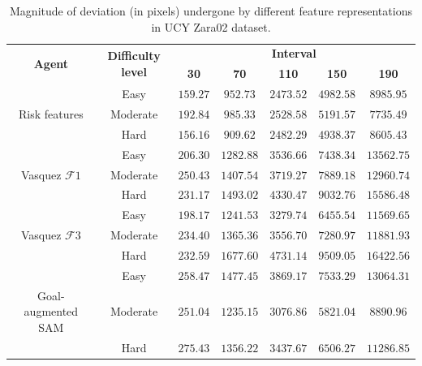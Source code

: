 \begin{table}[htbp]
	\begin{center}
		\renewcommand{\arraystretch}{1.3}
		\begin{tabular}{|c|c|c|c|c|c|c|}
			\hline
			\multicolumn{1}{|c|}{\multirow{2}{*}{\textbf{Agent}}} & \multicolumn{1}{c|}{\multirow{2}{*}{\textbf{Difficulty level}}}  & \multicolumn{5}{c|}{\multirow{1}{*}{\textbf{Interval}}}\\ \cline{3-7}
			
			&& \textbf{30} & \textbf{70} & \textbf{110} & \textbf{150}  &  \textbf{190} \\
			\hline
		    & Easy & $159.27$ & $952.73 $ & $2473.52$ & $4982.58$ & $8985.95 $ \\ \cline{2-7}
			Risk features 	& Moderate & $192.84$ & $985.33 $ & $2528.58$ & $5191.57$ & $7735.49 $ \\ \cline{2-7}
			& Hard & $156.16$ & $909.62 $ & $2482.29$ & $4938.37$ & $8605.43 $ \\
			\hline
			& Easy & $206.30$ & $1282.88$ & $3536.66$ & $7438.34 $ & $13562.75$ \\ \cline{2-7}
			Vasquez $\mathcal{F}1$  & Moderate & $250.43$ & $1407.54$ & $3719.27$ & $7889.18$ & $12960.74$ \\ \cline{2-7}
			& Hard & $231.17$ & $1493.02$ & $4330.47$ & $9032.76$ & $15586.48$ \\
			\hline
			& Easy & $198.17$ & $1241.53$ & $3279.74$ & $6455.54$ & $11569.65$ \\ \cline{2-7}
	    	Vasquez $\mathcal{F}3$ 	& Moderate & $234.40$ & $1365.36$ & $3556.70$ & $7280.97$ & $11881.93$ \\ \cline{2-7}
			& Hard & $232.59$ & $1677.60$ & $4731.14$ & $9509.05$ & $16422.56$ \\
			\hline			
			& Easy & $258.47$ & $1477.45$ & $3869.17$ & $7533.29$ & $13064.31$ \\ \cline{2-7}
			Goal-augmented SAM  & Moderate & $251.04$ & $1235.15$ & $3076.86$ & $5821.04$ & $8890.96 $ \\ \cline{2-7}
			& Hard & $275.43$ & $1356.22$ & $3437.67$ & $6506.27$ & $11286.85$ \\
			\hline
		\end{tabular}
	\end{center}
	\caption{Magnitude of deviation (in pixels) undergone by different feature representations in UCY Zara02 dataset.}
	\label{tab:zara02_inter_irl_drift_results}
\end{table}

